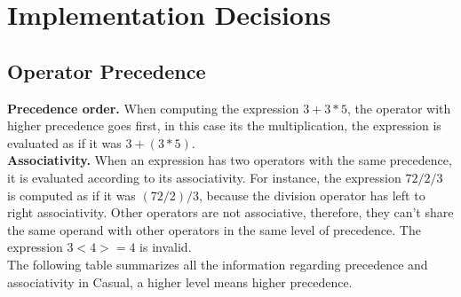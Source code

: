 \documentclass[12pt]{article}
\begin{document}
\newpage


\section{Implementation Decisions}
\subsection{Operator Precedence}

\textbf{Precedence order.} When computing the expression $3 + 3 * 5$, the operator with higher precedence goes first, in this case its the multiplication, the expression is  evaluated as if it was $3 + (3 * 5)$. \\

\textbf{Associativity.} When an expression has two operators with the same precedence, it is evaluated according to its associativity.  For instance, the expression $72 / 2 / 3$ is computed as if it was $(72 / 2) / 3$, because the division operator has left to right associativity. Other operators are not associative, therefore, they can't share the same operand with other operators in the same level of precedence. The expression $3 < 4 >= 4$ is invalid. \\

The following table summarizes all the information regarding precedence and associativity in Casual, a higher level means higher precedence.
\end{document}
